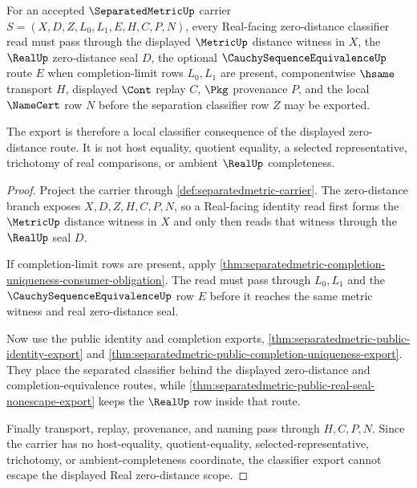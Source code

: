 \begin{theorem}
\label{thm:separatedmetric-real-zero-distance-scope}
For an accepted $\SeparatedMetricUp$ carrier $S=(X,D,Z,L_0,L_1,E,H,C,P,N)$, every Real-facing zero-distance classifier read must pass through the displayed $\MetricUp$ distance witness in $X$, the $\RealUp$ zero-distance seal $D$, the optional $\CauchySequenceEquivalenceUp$ route $E$ when completion-limit rows $L_0,L_1$ are present, componentwise $\hsame$ transport $H$, displayed $\Cont$ replay $C$, $\Pkg$ provenance $P$, and the local $\NameCert$ row $N$ before the separation classifier row $Z$ may be exported.

The export is therefore a local classifier consequence of the displayed zero-distance route. It is not host equality, quotient equality, a selected representative, trichotomy of real comparisons, or ambient $\RealUp$ completeness.
\end{theorem}
\begin{proof}
Project the carrier through \autoref{def:separatedmetric-carrier}. The zero-distance branch exposes $X,D,Z,H,C,P,N$, so a Real-facing identity read first forms the $\MetricUp$ distance witness in $X$ and only then reads that witness through the $\RealUp$ seal $D$.

If completion-limit rows are present, apply \autoref{thm:separatedmetric-completion-uniqueness-consumer-obligation}. The read must pass through $L_0,L_1$ and the $\CauchySequenceEquivalenceUp$ row $E$ before it reaches the same metric witness and real zero-distance seal.

Now use the public identity and completion exports, \autoref{thm:separatedmetric-public-identity-export} and \autoref{thm:separatedmetric-public-completion-uniqueness-export}. They place the separated classifier behind the displayed zero-distance and completion-equivalence routes, while \autoref{thm:separatedmetric-public-real-seal-nonescape-export} keeps the $\RealUp$ row inside that route.

Finally transport, replay, provenance, and naming pass through $H,C,P,N$. Since the carrier has no host-equality, quotient-equality, selected-representative, trichotomy, or ambient-completeness coordinate, the classifier export cannot escape the displayed Real zero-distance scope.
\end{proof}

